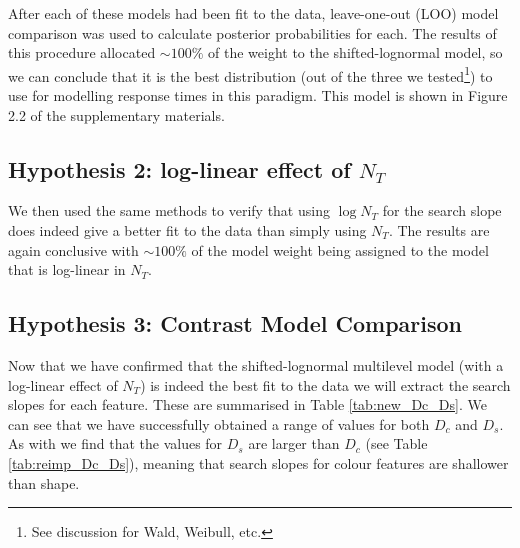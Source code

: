 \documentclass[preprint,12pt,authoryear]{elsarticle}
\begin{document}
After each of these models had been fit to the data, leave-one-out (LOO) model comparison was used to calculate posterior probabilities for each. The results of this procedure allocated $\sim100\%$ of the weight to the shifted-lognormal model, so we can conclude that it is the best distribution (out of the three we tested\footnote{See discussion for Wald, Weibull, etc.}) to use for modelling response times in this paradigm. This model is shown in Figure 2.2 of the supplementary materials.


\subsection{Hypothesis 2: log-linear effect of $N_T$}

We then used the same methods to verify that using $\log{N_T}$ for the search slope does indeed give a better fit to the data than simply using $N_T$. The results are again conclusive with $\sim100\%$ of the model weight being assigned to the model that is log-linear in $N_T$. 

\subsection{Hypothesis 3: Contrast Model Comparison}

Now that we have confirmed that the shifted-lognormal multilevel model (with a log-linear effect of $N_T$) is indeed the best fit to the data we will extract the search slopes for each feature. These are summarised in Table \ref{tab:new_Dc_Ds}. We can see that we have successfully obtained a range of values for both $D_c$ and $D_s$. As with \cite{buetti2019predicting} we find that the values for $D_s$ are larger than $D_c$ (see Table \ref{tab:reimp_Dc_Ds}), meaning that search slopes for colour features are shallower than shape. 
\end{document}
